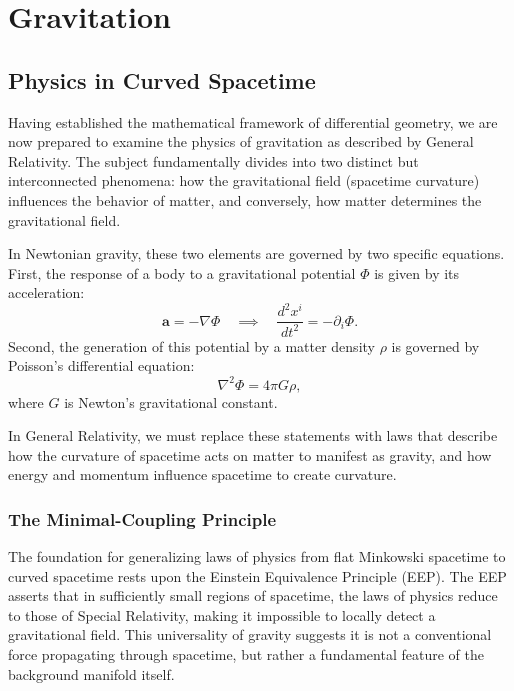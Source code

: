 \documentclass[11pt, a4paper]{report}
\begin{document}
\chapter{Gravitation}

\section{Physics in Curved Spacetime}

Having established the mathematical framework of differential geometry, we are now prepared to examine the physics of gravitation as described by General Relativity. The subject fundamentally divides into two distinct but interconnected phenomena: how the gravitational field (spacetime curvature) influences the behavior of matter, and conversely, how matter determines the gravitational field.

In Newtonian gravity, these two elements are governed by two specific equations. First, the response of a body to a gravitational potential $\Phi$ is given by its acceleration:
\begin{equation}
\label{eq:newton_accel}
\mathbf{a} = -\nabla\Phi \quad \implies \quad \frac{d^{2}x^{i}}{dt^{2}} = -\partial_{i}\Phi.
\end{equation}
Second, the generation of this potential by a matter density $\rho$ is governed by Poisson's differential equation:
\begin{equation}
\label{eq:poisson}
\nabla^{2}\Phi = 4\pi G\rho,
\end{equation}
where $G$ is Newton's gravitational constant. 

In General Relativity, we must replace these statements with laws that describe how the curvature of spacetime acts on matter to manifest as gravity, and how energy and momentum influence spacetime to create curvature.

\subsection*{The Minimal-Coupling Principle}
The foundation for generalizing laws of physics from flat Minkowski spacetime to curved spacetime rests upon the Einstein Equivalence Principle (EEP). The EEP asserts that in sufficiently small regions of spacetime, the laws of physics reduce to those of Special Relativity, making it impossible to locally detect a gravitational field. This universality of gravity suggests it is not a conventional force propagating through spacetime, but rather a fundamental feature of the background manifold itself.
\end{document}
